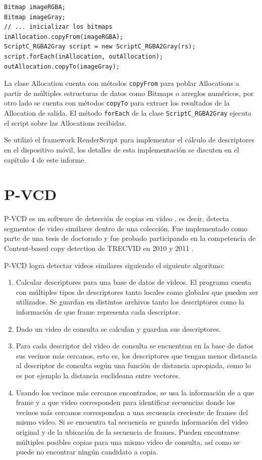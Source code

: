 \begin{lstlisting}[style=JavaInputStyle]
Bitmap imageRGBA;
Bitmap imageGray;
// ... inicializar los bitmaps
inAllocation.copyFrom(imageRGBA);
ScriptC_RGBA2Gray script = new ScriptC_RGBA2Gray(rs);
script.forEach(inAllocation, outAllocation);
outAllocation.copyTo(imageGray);
\end{lstlisting}

La clase Allocation cuenta con métodos \texttt{copyFrom} para poblar Allocations a partir de múltiples estructuras de datos como Bitmaps o arreglos numéricos, por otro lado se cuenta con métodos \texttt{copyTo} para extraer los resultados de la Allocation de salida. El método \texttt{forEach} de la clase \texttt{ScriptC\_RGBA2Gray} ejecuta el script sobre las Allocations recibidas.

Se utilizó el framework RenderScript para implementar el cálculo de descriptores en el dispositivo móvil, los detalles de esta implementación se discuten en el capítulo 4 de este informe.

\section{P-VCD}\label{pvcd}
P-VCD es un software de detección de copias en video \cite{p-vcd1}, es decir, detecta segmentos de video similares dentro de una colección. Fue implementado como parte de una tesis de doctorado y fue probado participando en la competencia de Content-based copy detection de TRECVID en 2010 y 2011 \cite{p-vcd2}.

P-VCD logra detectar videos similares siguiendo el siguiente algoritmo:
\begin{enumerate}
\item Calcular descriptores para una base de datos de videos. El programa cuenta con múltiples tipos de descriptores tanto locales como globales que pueden ser utilizados. Se guardan en distintos archivos tanto los descriptores como la información de que frame representa cada descriptor.
\item Dado un video de consulta se calculan y guardan sus descriptores.
\item Para cada descriptor del video de consulta se encuentran en la base de datos sus vecinos más cercanos, esto es, los descriptores que tengan menor distancia al descriptor de consulta según una función de distancia apropiada, como lo es por ejemplo la distancia euclideana entre vectores.
\item Usando los vecinos más cercanos encontrados, se usa la información de a que frame y a que video corresponden para identificar secuencias donde los vecinos más cercanos correspondan a una secuencia creciente de frames del mismo video. Si se encuentra tal secuencia se guarda información del video original y de la ubicación de la secuencia de frames. Pueden encontrarse múltiples posibles copias para una mismo video de consulta, así como se puede no encontrar ningún candidato a copia. 
\end{enumerate}

